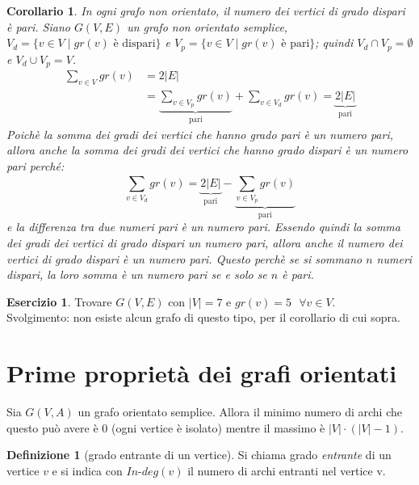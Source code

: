 \documentclass[a4paper, openany]{book}
\theoremstyle{plain}
\newtheorem{cor}[thm]{Corollario}
\theoremstyle{definition}
\newtheorem{defn}{Definizione}[chapter]
\newtheorem{eser}{Esercizio}[section]
\begin{document}
\begin{cor}
    In ogni grafo non orientato, il numero dei vertici di grado dispari è pari.
\proof
    Siano $G(V,E)$ un grafo non orientato semplice, ${V_d = \{v \in V \mid gr(v) \text{ è dispari}\}}$ e
    ${V_p = \{v \in V \mid gr(v) \text{ è pari}\}}$; quindi ${V_d \cap V_p = \emptyset}$ e 
    ${V_d \cup V_p = V}$.
    \begin{equation*}
    \begin{split}
        \sum_{v \in V}^{} gr(v) & = 
        2|E| \\ & = 
        \underbrace{{\sum_{v \in V_p}^{} gr(v)}}_{\text{pari}} + {\sum_{v \in V_d}^{} gr(v)} = 
        \underbrace{2|E|}_{\text{pari}}
    \end{split}
    \end{equation*}
    Poichè la somma dei gradi dei vertici che hanno grado pari è un numero pari, 
    allora anche la somma dei gradi dei vertici che hanno grado dispari è un numero pari perché:
    \[
        {\sum_{v \in V_d}^{} gr(v)} = \underbrace{2|E|}_{\text{pari}} - 
                \underbrace{{\sum_{v \in V_p}^{} gr(v)}}_{\text{pari}}
    \]
    e la differenza tra due numeri pari è un numero pari. Essendo quindi la somma dei gradi dei vertici
    di grado dispari un numero pari, allora anche il numero dei vertici di grado dispari è un numero
    pari. Questo perchè se si sommano $n$ numeri dispari, la loro somma è un numero pari 
    se e solo se $n$ è pari.
\endproof
\end{cor}

\begin{eser}
    Trovare $G(V,E)$ con $|V| = 7$ e ${gr(v) = 5 \text{ } \forall v \in V}$.\\
    Svolgimento: non esiste alcun grafo di questo tipo, per il corollario di cui sopra.%
\end{eser}




\section{Prime proprietà dei grafi orientati}
Sia $G(V,A)$ un grafo orientato semplice. Allora il minimo numero di archi che questo può
avere è $0$ (ogni vertice è isolato) mentre il massimo è ${|V| \cdot (|V|-1)}$.

\begin{defn}[grado entrante di un vertice]
Si chiama grado \emph{entrante} di un vertice $v$ e si indica con ${In\text{-}deg(v)}$ il numero
di archi entranti nel vertice v.
\end{defn}
\end{document}
